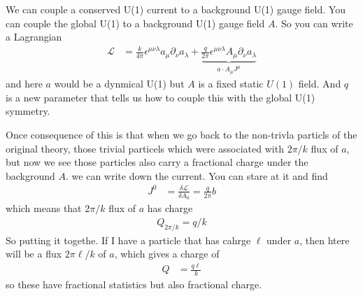We can couple a conserved U(1) current to a background U(1) gauge field.
You can couple the global U(1) to a background U(1) gauge field $A$.
So you can write a Lagrangian
\begin{align}
    \mathcal{L} &=
    \frac{k}{4\pi}\epsilon^{\mu\nu\lambda} a_\mu \partial_\nu a_\lambda
    +
    \underbrace{
    \frac{q}{2\pi}\epsilon^{\mu\nu\lambda} A_\mu \partial_\nu a_\lambda
    }_{
    a\cdot A_\mu J^\mu
    }
\end{align}
and here $a$ would be a dynmical U(1)
but $A$ is a fixed static $U(1)$ field.
And $q$ is a new parameter that tells us how to couple this with the global U(1)
symmetry.


Once consequence of this is that when we go back to the non-trivla particls of
the original theory,
those trivial particels which were associated with $2\pi/k$ flux of $a$,
but now we see those particles also carry a fractional charge under the
background $A$.
we can write down the current.
You can stare at it and find
\begin{align}
    J^0 &=
    \frac{\delta \mathcal{L}}{\delta A_0}
    =
    \frac{q}{2\pi}b
\end{align}
which means that $2\pi/k$ flux of $a$ has charge 
\begin{align}
    Q_{2\pi/k} = q/k
\end{align}
So putting it togethe.
If I have a particle that has cahrge $\ell$ under $a$,
then htere will be a flux $2\pi \ell / k$
of $a$,
which gives a charge of
\begin{align}
    Q &=
    \frac{q\ell }{k}
\end{align}
so these have fractional statistics but also fractional charge.

